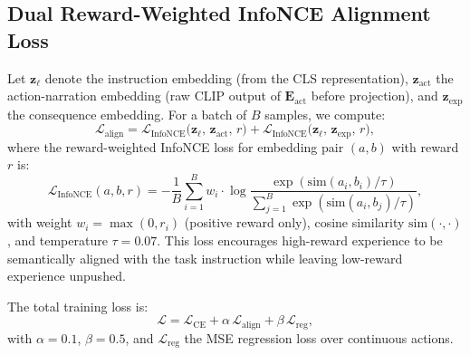 \documentclass{article}
\begin{document}
\subsection{Dual Reward-Weighted InfoNCE Alignment Loss}
\label{sec:alignloss}
Let $\mathbf{z}_\ell$ denote the instruction embedding (from the CLS representation),
$\mathbf{z}_\text{act}$ the action-narration embedding (raw CLIP output of $\mathbf{E}_\text{act}$
before projection), and $\mathbf{z}_\text{exp}$ the consequence embedding.
For a batch of $B$ samples, we compute:
\begin{equation}
  \mathcal{L}_\text{align}
    = \mathcal{L}_\text{InfoNCE}\!\bigl(\mathbf{z}_\ell,\,\mathbf{z}_\text{act},\,r\bigr)
    + \mathcal{L}_\text{InfoNCE}\!\bigl(\mathbf{z}_\ell,\,\mathbf{z}_\text{exp},\,r\bigr),
\end{equation}
where the reward-weighted InfoNCE loss for embedding pair $(a, b)$ with reward $r$ is:
\begin{equation}
  \mathcal{L}_\text{InfoNCE}(a, b, r)
    = -\frac{1}{B}\sum_{i=1}^{B}
      w_i \cdot
      \log\frac{\exp(\text{sim}(a_i, b_i)/\tau)}
               {\sum_{j=1}^{B}\exp(\text{sim}(a_i, b_j)/\tau)},
\end{equation}
with weight $w_i = \max(0, r_i)$ (positive reward only), cosine similarity
$\text{sim}(\cdot,\cdot)$, and temperature $\tau = 0.07$.
This loss encourages high-reward experience to be semantically aligned with the
task instruction while leaving low-reward experience unpushed.

The total training loss is:
\begin{equation}
  \mathcal{L} = \mathcal{L}_\text{CE} + \alpha\,\mathcal{L}_\text{align}
               + \beta\,\mathcal{L}_\text{reg},
\end{equation}
with $\alpha = 0.1$, $\beta = 0.5$, and $\mathcal{L}_\text{reg}$
the MSE regression loss over continuous actions.
\end{document}
